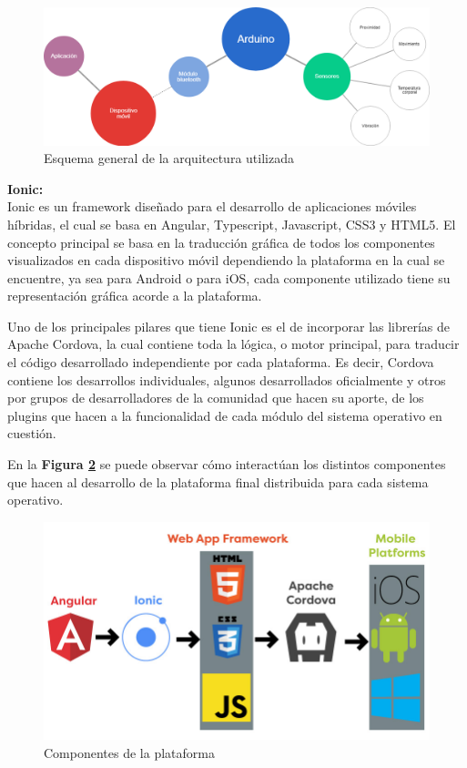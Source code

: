 \documentclass{IEEEtran}
\begin{document}
			\begin{figure}[h]
				\centering
				\includegraphics[width=1\linewidth]{esquemageneral}
				\caption{Esquema general de la arquitectura utilizada}
				\label{esquemageneral}
			\end{figure}

            \textbf{Ionic:}\\
			Ionic es un framework diseñado para el desarrollo de aplicaciones móviles híbridas, el cual se basa en Angular, Typescript, Javascript, CSS3 y HTML5. El concepto principal se basa en la traducción gráfica de todos los componentes visualizados en cada dispositivo móvil dependiendo la plataforma en la cual se encuentre, ya sea para Android o para iOS, cada componente utilizado tiene su representación gráfica acorde a la plataforma.

			Uno de los principales pilares que tiene Ionic es el de incorporar las librerías de Apache Cordova, la cual contiene toda la lógica, o motor principal, para traducir el código desarrollado independiente por cada plataforma. Es decir, Cordova contiene los desarrollos individuales, algunos desarrollados oficialmente y otros por grupos de desarrolladores de la comunidad que hacen su aporte, de los plugins que hacen a la funcionalidad de cada módulo del sistema operativo en cuestión. 

			En la \textbf{Figura \ref{ionic-angular-cordova}} se puede observar cómo interactúan los distintos componentes que hacen al desarrollo de la plataforma final distribuida para cada sistema operativo.

			\begin{figure}[h]
				\centering
				\includegraphics[width=1\linewidth]{ionic-angular-cordova.jpg}
				\caption{Componentes de la plataforma}
				\label{ionic-angular-cordova}
			\end{figure}
\end{document}
